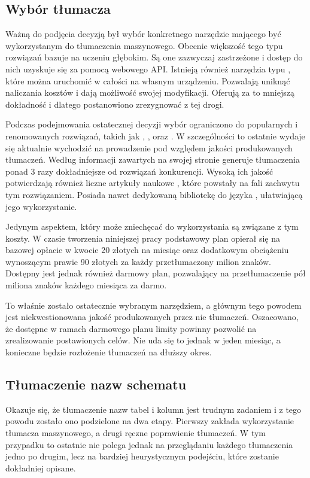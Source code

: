 \subsection{Wybór tłumacza}
Ważną do podjęcia decyzją był wybór konkretnego narzędzie mającego być wykorzystanym do tłumaczenia maszynowego. Obecnie większość tego typu rozwiązań bazuje na uczeniu głębokim. Są one zazwyczaj zastrzeżone i dostęp do nich uzyskuje się za pomocą webowego API. Istnieją również narzędzia typu , które można uruchomić w całości na własnym urządzeniu. Pozwalają uniknąć naliczania kosztów i dają możliwość swojej modyfikacji. Oferują za to mniejszą dokładność i dlatego postanowiono zrezygnować z tej drogi.

Podczas podejmowania ostatecznej decyzji wybór ograniczono do popularnych i renomowanych rozwiązań, takich jak  \cite{google-translation-api},  \cite{microsoft-translator},  \cite{amazon-translator} oraz  \cite{deepl}. W szczególności to ostatnie wydaje się aktualnie wychodzić na prowadzenie pod względem jakości produkowanych tłumaczeń. Według informacji zawartych na swojej stronie  generuje tłumaczenia ponad 3 razy dokładniejsze od rozwiązań konkurencji. Wysoką ich jakość potwierdzają również liczne artykuły naukowe \cite{Yulianto2021}\cite{Ternero2021}\cite{Bahasa2023}, które powstały na fali zachwytu tym rozwiązaniem. Posiada nawet dedykowaną bibliotekę do języka , ułatwiającą jego wykorzystanie. 

Jedynym aspektem, który może zniechęcać do wykorzystania  są związane z tym koszty. W czasie tworzenia niniejszej pracy podstawowy plan opierał się na bazowej opłacie w kwocie 20 złotych na miesiąc oraz dodatkowym obciążeniu wynoszącym prawie 90 złotych za każdy przetłumaczony milion znaków. Dostępny jest jednak również darmowy plan, pozwalający na przetłumaczenie pół miliona znaków każdego miesiąca za darmo.

To właśnie  zostało ostatecznie wybranym narzędziem, a głównym tego powodem jest niekwestionowana jakość produkowanych przez nie tłumaczeń. Oszacowano, że dostępne w ramach darmowego planu limity powinny pozwolić na zrealizowanie postawionych celów. Nie uda się to jednak w jeden miesiąc, a konieczne będzie rozłożenie tłumaczeń na dłuższy okres.

\subsection{Tłumaczenie nazw schematu}
Okazuje się, że tłumaczenie nazw tabel i kolumn jest trudnym zadaniem i z tego powodu zostało ono podzielone na dwa etapy. Pierwszy zakłada wykorzystanie tłumacza maszynowego, a drugi ręczne poprawienie tłumaczeń. W tym przypadku to ostatnie nie polega jednak na przeglądaniu każdego tłumaczenia jedno po drugim, lecz na bardziej heurystycznym podejściu, które zostanie dokładniej opisane.

